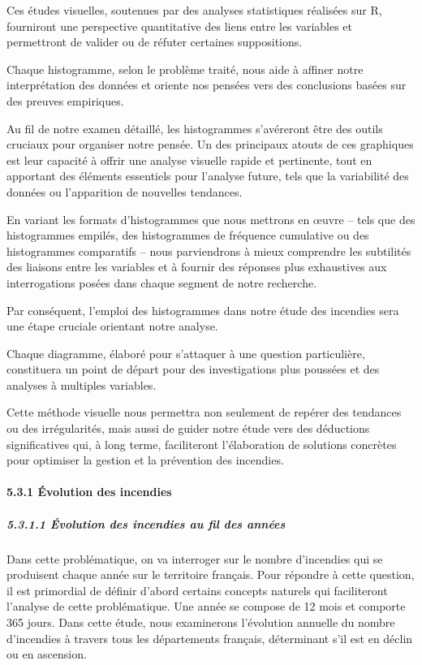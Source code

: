 \documentclass[
]{article}
\begin{document}
Ces études visuelles, soutenues par des analyses statistiques réalisées
sur R, fourniront une perspective quantitative des liens entre les
variables et permettront de valider ou de réfuter certaines
suppositions.

Chaque histogramme, selon le problème traité, nous aide à affiner notre
interprétation des données et oriente nos pensées vers des conclusions
basées sur des preuves empiriques.

Au fil de notre examen détaillé, les histogrammes s'avéreront être des
outils cruciaux pour organiser notre pensée. Un des principaux atouts de
ces graphiques est leur capacité à offrir une analyse visuelle rapide et
pertinente, tout en apportant des éléments essentiels pour l'analyse
future, tels que la variabilité des données ou l'apparition de nouvelles
tendances.

En variant les formats d'histogrammes que nous mettrons en œuvre -- tels
que des histogrammes empilés, des histogrammes de fréquence cumulative
ou des histogrammes comparatifs -- nous parviendrons à mieux comprendre
les subtilités des liaisons entre les variables et à fournir des
réponses plus exhaustives aux interrogations posées dans chaque segment
de notre recherche.

Par conséquent, l'emploi des histogrammes dans notre étude des incendies
sera une étape cruciale orientant notre analyse.

Chaque diagramme, élaboré pour s'attaquer à une question particulière,
constituera un point de départ pour des investigations plus poussées et
des analyses à multiples variables.

Cette méthode visuelle nous permettra non seulement de repérer des
tendances ou des irrégularités, mais aussi de guider notre étude vers
des déductions significatives qui, à long terme, faciliteront
l'élaboration de solutions concrètes pour optimiser la gestion et la
prévention des incendies.

\paragraph{5.3.1 Évolution des
incendies}\label{uxe9volution-des-incendies}

\subparagraph{5.3.1.1 Évolution des incendies au fil des
années}\label{uxe9volution-des-incendies-au-fil-des-annuxe9es}

Dans cette problématique, on va interroger sur le nombre d'incendies qui
se produisent chaque année sur le territoire français. Pour répondre à
cette question, il est primordial de définir d'abord certains concepts
naturels qui faciliteront l'analyse de cette problématique. Une année se
compose de 12 mois et comporte 365 jours. Dans cette étude, nous
examinerons l'évolution annuelle du nombre d'incendies à travers tous
les départements français, déterminant s'il est en déclin ou en
ascension.
\end{document}
